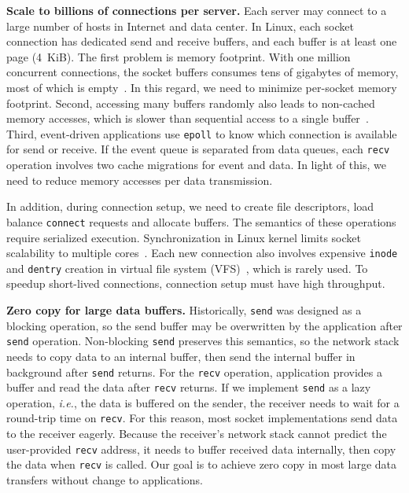 \textbf{Scale to billions of connections per server.}
Each server may connect to a large number of hosts in Internet and data center. In Linux, each socket connection has dedicated send and receive buffers, and each buffer is at least one page (4~KiB). The first problem is memory footprint. With one million concurrent connections, the socket buffers consumes tens of gigabytes of memory, most of which is empty~\cite{lin2016scalable}. In this regard, we need to minimize per-socket memory footprint. Second, accessing many buffers randomly also leads to non-cached memory accesses, which is slower than sequential access to a single buffer~\cite{li2017kv}. Third, event-driven applications use \texttt{epoll} to know which connection is available for send or receive. If the event queue is separated from data queues, each \texttt{recv} operation involves two cache migrations for event and data. In light of this, we need to reduce memory accesses per data transmission.

In addition, during connection setup, we need to create file descriptors, load balance \texttt{connect} requests and allocate buffers. The semantics of these operations require serialized execution. Synchronization in Linux kernel limits socket scalability to multiple cores~\cite{lin2016scalable,han2012megapipe}. Each new connection also involves expensive \texttt{inode} and \texttt{dentry} creation in virtual file system (VFS)~\cite{boyd2010analysis}, which is rarely used. To speedup short-lived connections, connection setup must have high throughput.



\textbf{Zero copy for large data buffers.}
Historically, \texttt{send} was designed as a blocking operation, so the send buffer may be overwritten by the application after \texttt{send} operation.
Non-blocking \texttt{send} preserves this semantics, so the network stack needs to copy data to an internal buffer, then send the internal buffer in background after \texttt{send} returns.
For the \texttt{recv} operation, application provides a buffer and read the data after \texttt{recv} returns.
If we implement \texttt{send} as a lazy operation, \textit{i.e.}, the data is buffered on the sender, the receiver needs to wait for a round-trip time on \texttt{recv}.
For this reason, most socket implementations send data to the receiver eagerly. Because the receiver's network stack cannot predict the user-provided \texttt{recv} address, it needs to buffer received data internally, then copy the data when \texttt{recv} is called.
Our goal is to achieve zero copy in most large data transfers without change to applications.

